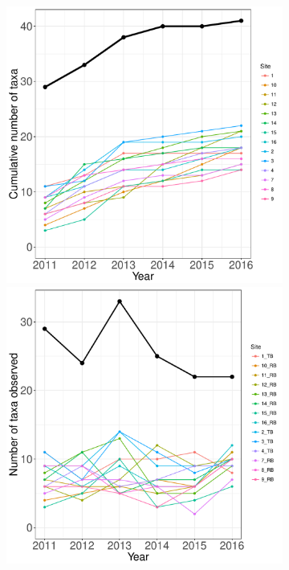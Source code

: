 \documentclass[11pt, oneside]{article}
\begin{document}
\begin{figure}[h!]
\begin{figure}[h!]
\centering
\includegraphics[scale = 0.4]{fce-fish-RehageWet_species_accumulation_curve.pdf}
\includegraphics[scale = 0.4]{fce-fish-RehageWet_num_taxa_over_time.pdf}

\end{figure}
\end{figure}
\end{document}
